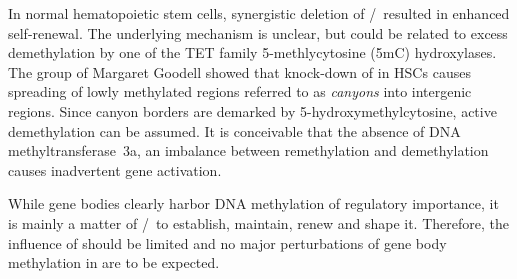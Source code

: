 In normal hematopoietic stem cells, synergistic deletion of /$\,$ resulted in enhanced self-renewal\cite{Challen2014}. The underlying mechanism is unclear, but could be related to excess demethylation by one of the TET family 5-methlycytosine (5mC) hydroxylases. The group of Margaret Goodell showed that knock-down of  in HSCs causes spreading of lowly methylated regions referred to as \emph{canyons} into intergenic regions\cite{Jeong2014}. Since canyon borders are demarked by 5-hydroxymethylcytosine, active demethylation can be assumed\cite{Jeong2014}. It is conceivable that the absence of DNA methyltransferase~3a, an imbalance between remethylation and demethylation causes inadvertent gene activation. 

While gene bodies clearly harbor DNA methylation of regulatory importance, it is mainly a matter of   /$\,$ to establish, maintain, renew and shape it. Therefore, the influence of  should be limited and no major perturbations of gene body methylation in \dnmtchip are to be expected.